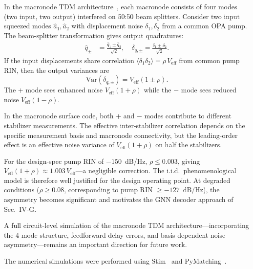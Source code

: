 \documentclass[twocolumn,showpacs,preprintnumbers,amsmath,amssymb,superscriptaddress]{revtex4-2}
\begin{document}
In the macronode TDM architecture~\cite{menicucci2014,walshe2019,walshe2020}, each macronode consists of four modes (two input, two output) interfered on 50:50 beam splitters. Consider two input squeezed modes $\hat{a}_1, \hat{a}_2$ with displacement noise $\delta_1, \delta_2$ from a common OPA pump. The beam-splitter transformation gives output quadratures:
\begin{align}
\hat{q}_{\pm} &= \frac{\hat{q}_1 \pm \hat{q}_2}{\sqrt{2}}, \quad
\delta_{q,\pm} = \frac{\delta_1 \pm \delta_2}{\sqrt{2}}.
\end{align}
If the input displacements share correlation $\langle\delta_1\delta_2\rangle = \rho\,V_{\mathrm{eff}}$ from common pump RIN, then the output variances are
\begin{equation}
\mathrm{Var}(\delta_{q,\pm}) = V_{\mathrm{eff}}(1 \pm \rho).
\end{equation}
The $+$ mode sees enhanced noise $V_{\mathrm{eff}}(1+\rho)$ while the $-$ mode sees reduced noise $V_{\mathrm{eff}}(1-\rho)$.

In the macronode surface code, both $+$ and $-$ modes contribute to different stabilizer measurements. The effective inter-stabilizer correlation depends on the specific measurement basis and macronode connectivity, but the leading-order effect is an effective noise variance of $V_{\mathrm{eff}}(1 + \rho)$ on half the stabilizers.

For the design-spec pump RIN of $-150$~dB/Hz, $\rho \leq 0.003$, giving $V_{\mathrm{eff}}(1+\rho) \approx 1.003\,V_{\mathrm{eff}}$---a negligible correction. The i.i.d.\ phenomenological model is therefore well justified for the design operating point. At degraded conditions ($\rho \geq 0.08$, corresponding to pump RIN $\geq -127$~dB/Hz), the asymmetry becomes significant and motivates the GNN decoder approach of Sec.~IV-G.

A full circuit-level simulation of the macronode TDM architecture---incorporating the 4-mode structure, feedforward delay errors, and basis-dependent noise asymmetry---remains an important direction for future work.

\begin{acknowledgments}
The numerical simulations were performed using Stim~\cite{gidney2021} and PyMatching~\cite{higgott2023}.
\end{acknowledgments}

\end{document}
